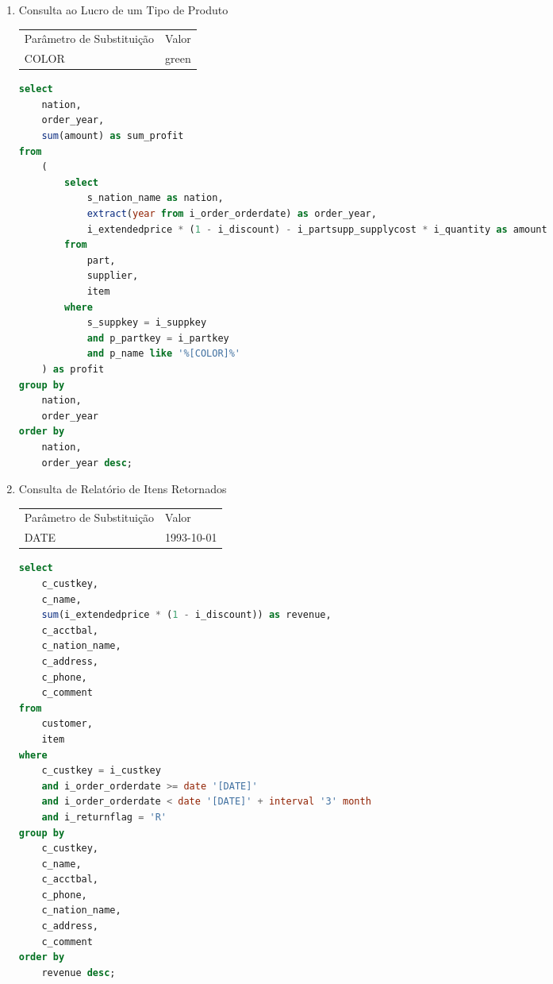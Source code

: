 \begin{enumerate}
	\begin{lstlisting}[language=SQL]
select
	order_year,
	sum(case
		when nation = '[NATION]' then volume
		else 0
	end) / sum(volume) as mkt_share
from
	(
		select
			extract(year from i_order_orderdate) as order_year,
			i_extendedprice * (1 - i_discount) as volume,
			s_nation_name as nation
		from
			part,
			supplier,
			item,
			customer
		where
			p_partkey = i_partkey
			and s_suppkey = i_suppkey
			and i_custkey = c_custkey
			and c_region_name = '[REGION]'
			and i_order_orderdate between date '1995-01-01' and date '1996-12-31'
			and p_type = '[TYPE]'
	) as all_nations
group by
	order_year
order by
	order_year;
	\end{lstlisting}

\item Consulta ao Lucro de um Tipo de Produto

\begin{tabular}{ll}
	Parâmetro de Substituição & Valor\\
	COLOR & green\\
\end{tabular}

	\begin{lstlisting}[language=SQL]
select
	nation,
	order_year,
	sum(amount) as sum_profit
from
	(
		select
			s_nation_name as nation,
			extract(year from i_order_orderdate) as order_year,
			i_extendedprice * (1 - i_discount) - i_partsupp_supplycost * i_quantity as amount
		from
			part,
			supplier,
			item
		where
			s_suppkey = i_suppkey
			and p_partkey = i_partkey
			and p_name like '%[COLOR]%'
	) as profit
group by
	nation,
	order_year
order by
	nation,
	order_year desc;

\end{lstlisting}

\item Consulta de Relatório de Itens Retornados

\begin{tabular}{ll}
	Parâmetro de Substituição & Valor\\
	DATE & 1993-10-01\\
\end{tabular}

	\begin{lstlisting}[language=SQL]
select
	c_custkey,
	c_name,
	sum(i_extendedprice * (1 - i_discount)) as revenue,
	c_acctbal,
	c_nation_name,
	c_address,
	c_phone,
	c_comment
from
	customer,
	item
where
	c_custkey = i_custkey
	and i_order_orderdate >= date '[DATE]'
	and i_order_orderdate < date '[DATE]' + interval '3' month
	and i_returnflag = 'R'
group by
	c_custkey,
	c_name,
	c_acctbal,
	c_phone,
	c_nation_name,
	c_address,
	c_comment
order by
	revenue desc;
	

\end{lstlisting}
\end{enumerate}
